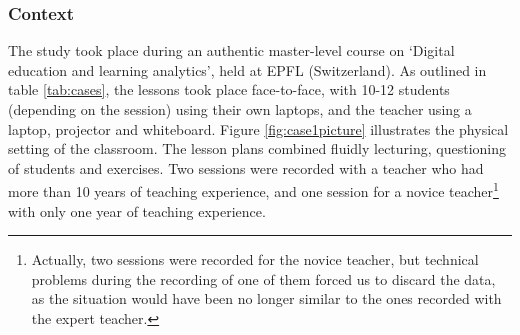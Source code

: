 \documentclass[10pt,journal,compsoc]{IEEEtran}
\begin{document}

\subsubsection{Context}

The study took place during an authentic master-level course on `Digital education and learning analytics', held at EPFL (Switzerland). As outlined in table \ref{tab:cases}, the lessons took place face-to-face, with 10-12 students (depending on the session) using their own laptops, and the teacher using a laptop, projector and whiteboard. Figure \ref{fig:case1picture} illustrates the physical setting of the classroom. The lesson plans combined fluidly lecturing, questioning of students and exercises. Two sessions were recorded with a teacher who had more than 10 years of teaching experience, and one session for a novice teacher\footnote{Actually, two sessions were recorded for the novice teacher, but technical problems during the recording of one of them forced us to discard the data, as the situation would have been no longer similar to the ones recorded with the expert teacher.} with only one year of teaching experience. %

\end{document}
